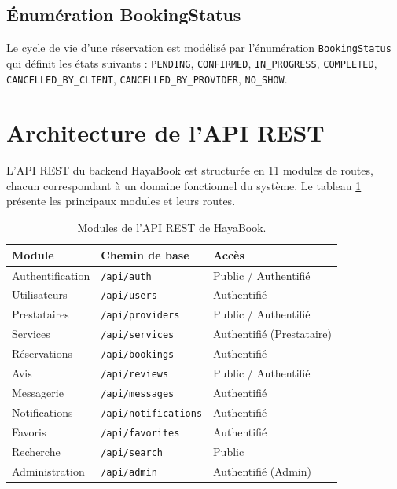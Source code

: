 \subsection{Énumération BookingStatus}

Le cycle de vie d'une réservation est modélisé par l'énumération \texttt{BookingStatus} qui définit les états suivants : \texttt{PENDING}, \texttt{CONFIRMED}, \texttt{IN\_PROGRESS}, \texttt{COMPLETED}, \texttt{CANCELLED\_BY\_CLIENT}, \texttt{CANCELLED\_BY\_PROVIDER}, \texttt{NO\_SHOW}.

\section{Architecture de l'API REST}

L'API REST du backend HayaBook est structurée en 11 modules de routes, chacun correspondant à un domaine fonctionnel du système. Le tableau \ref{tab:api} présente les principaux modules et leurs routes.

\begin{table}[h]
\centering
\caption{Modules de l'API REST de HayaBook.}
\label{tab:api}
\begin{tabular}{|l|l|l|}
\hline
\textbf{Module} & \textbf{Chemin de base} & \textbf{Accès} \\
\hline
Authentification & \texttt{/api/auth} & Public / Authentifié \\
\hline
Utilisateurs & \texttt{/api/users} & Authentifié \\
\hline
Prestataires & \texttt{/api/providers} & Public / Authentifié \\
\hline
Services & \texttt{/api/services} & Authentifié (Prestataire) \\
\hline
Réservations & \texttt{/api/bookings} & Authentifié \\
\hline
Avis & \texttt{/api/reviews} & Public / Authentifié \\
\hline
Messagerie & \texttt{/api/messages} & Authentifié \\
\hline
Notifications & \texttt{/api/notifications} & Authentifié \\
\hline
Favoris & \texttt{/api/favorites} & Authentifié \\
\hline
Recherche & \texttt{/api/search} & Public \\
\hline
Administration & \texttt{/api/admin} & Authentifié (Admin) \\
\hline
\end{tabular}
\end{table}

